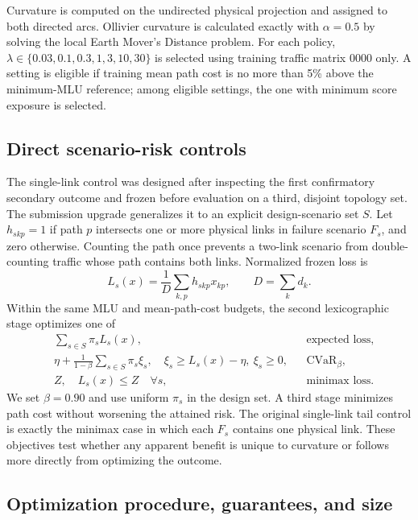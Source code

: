 \documentclass[preprint,12pt]{elsarticle}
\begin{document}
Curvature is computed on the undirected physical projection and assigned to
both directed arcs. Ollivier curvature is calculated exactly with $\alpha=0.5$
by solving the local Earth Mover's Distance problem. For each policy,
$\lambda\in\{0.03,0.1,0.3,1,3,10,30\}$ is selected using training traffic
matrix 0000 only. A setting is eligible if training mean path cost is no more
than 5\% above the minimum-MLU reference; among eligible settings, the one with
minimum score exposure is selected.

\subsection{Direct scenario-risk controls}

The single-link control was designed after inspecting the first confirmatory
secondary outcome and frozen before evaluation on a third, disjoint topology
set. The submission upgrade generalizes it to an explicit design-scenario set
$S$. Let $h_{skp}=1$ if path $p$ intersects one or more physical links in
failure scenario $F_s$, and zero otherwise. Counting the path once prevents a
two-link scenario from double-counting traffic whose path contains both links.
Normalized frozen loss is
\begin{equation}
 L_s(x)=\frac{1}{D}\sum_{k,p}h_{skp}x_{kp},\qquad D=\sum_k d_k.
 \label{eq:scenario-loss}
\end{equation}
Within the same MLU and mean-path-cost budgets, the second lexicographic stage
optimizes one of
\begin{align}
 &\sum_{s\in S}\pi_s L_s(x), &&\text{expected loss},\\
 &\eta+\frac{1}{1-\beta}\sum_{s\in S}\pi_s\xi_s,
   \quad \xi_s\ge L_s(x)-\eta,\ \xi_s\ge0, &&\text{CVaR}_{\beta},\\
 &Z,\quad L_s(x)\le Z\quad\forall s, &&\text{minimax loss}.
 \label{eq:scenario-risk}
\end{align}
We set $\beta=0.90$ and use uniform $\pi_s$ in the design set. A third stage
minimizes path cost without worsening the attained risk. The original
single-link tail control is exactly the minimax case in which each $F_s$
contains one physical link. These objectives test whether any apparent benefit
is unique to curvature or follows more directly from optimizing the outcome.

\subsection{Optimization procedure, guarantees, and size}
\end{document}

